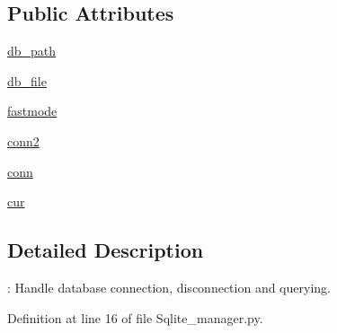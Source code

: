 \subsection*{\-Public \-Attributes}
\begin{DoxyCompactItemize}
\item 
\hyperlink{classirna_1_1iRNA__pred_1_1Sqlite__manager_1_1Sqlite__manager_a2b57feee9cdabf2ea396ff827737c3fe}{db\-\_\-path}
\item 
\hyperlink{classirna_1_1iRNA__pred_1_1Sqlite__manager_1_1Sqlite__manager_aacef37f4f6945d8676b524b8c50e227b}{db\-\_\-file}
\item 
\hyperlink{classirna_1_1iRNA__pred_1_1Sqlite__manager_1_1Sqlite__manager_ad637e4dc91f2eaa43ddfe25d1236a775}{fastmode}
\item 
\hyperlink{classirna_1_1iRNA__pred_1_1Sqlite__manager_1_1Sqlite__manager_ad0b959a24ff11ec813d46f1fc61ec96f}{conn2}
\item 
\hyperlink{classirna_1_1iRNA__pred_1_1Sqlite__manager_1_1Sqlite__manager_a4bfee60ded8574f01d14edb8c64c9725}{conn}
\item 
\hyperlink{classirna_1_1iRNA__pred_1_1Sqlite__manager_1_1Sqlite__manager_a6757d0d89fd278edd50e3aeef4884166}{cur}
\end{DoxyCompactItemize}


\subsection{\-Detailed \-Description}
\-: \-Handle database connection, disconnection and querying. 

\-Definition at line 16 of file \-Sqlite\-\_\-manager.\-py.



